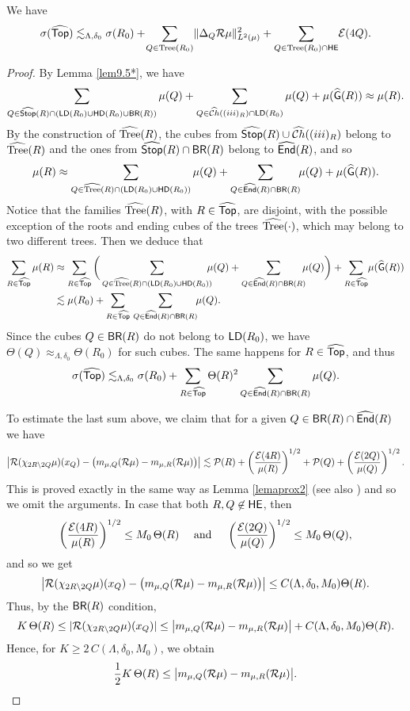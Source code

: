 \vv


\begin{lemma}\label{lemtop8}
We have
$$\sigma({\widehat{{\mathsf {Top}}}})  \lesssim_{\Lambda,\delta_0}\sigma(R_0) +\!\sum_{Q\in{\rm Tree}(R_0)}\!\|\Delta_Q{\mathcal R}\mu\|_{L^2(\mu)}^2+ \sum_{Q\in{\rm Tree}(R_0)\cap{\mathsf {HE}}}\! {\mathcal E}(4Q).$$
\end{lemma}

\begin{proof} 
By Lemma \ref{lem9.5*}, we have
$$\sum_{Q\in{\widehat{{\mathsf {Stop}}}}(R)\cap({\mathsf{LD}}(R_0)\cup{\mathsf{HD}}(R_0)\cup{\mathsf {BR}}(R))}\mu(Q) 
+\sum_{Q\in{\widehat{{\mathcal Ch}}}((iii)_R)\cap {\mathsf{LD}}(R_0)}\mu(Q) + \mu({\widehat{{\mathsf{G}}}}(R))
\approx \mu(R).$$
By the construction of ${\widehat{{\rm Tree}}}(R)$, the cubes from 
${\widehat{{\mathsf {Stop}}}}(R)\cup {\widehat{{\mathcal Ch}}}((iii)_R)$ belong to ${\widehat{{\rm Tree}}}(R)$ and the ones from ${\widehat{{\mathsf {Stop}}}}(R)\cap{\mathsf {BR}}(R)$ belong to ${\widehat{{\mathsf{End}}}}(R)$, and so
$$\mu(R)\approx \sum_{Q\in{\widehat{{\rm Tree}}}(R)\cap({\mathsf{LD}}(R_0)\cup{\mathsf{HD}}(R_0))}\mu(Q) 
+ \sum_{Q\in{\widehat{{\mathsf{End}}}}(R)\cap{\mathsf {BR}}(R)}\!\!\mu(Q)
+ \mu({\widehat{{\mathsf{G}}}}(R)).$$
Notice that the families ${\widehat{{\rm Tree}}}(R)$, with $R\in{\widehat{{\mathsf {Top}}}}$, are disjoint, with the possible exception of
the roots and ending cubes of the trees ${\widehat{{\rm Tree}}}(\cdot)$, which may belong to two different trees. 
Then we deduce that
\begin{align*}
\sum_{R\in\wh\ttt} \mu(R) & \approx \sum_{R\in\wh\ttt} \bigg(
\sum_{Q\in\wh\tree(R)\cap(\LD(R_0)\cup\HD(R_0))}\!\!\!\!\mu(Q) + \sum_{Q\in\wh\End(R)\cap\BR(R)}\!\!\!\mu(Q)\bigg)
+\sum_{R\in\wh\ttt}\! \mu(\wh\sG(R))\\
& \lesssim \mu(R_0) + \sum_{R\in\wh\ttt}\,\sum_{Q\in\wh\End(R)\cap\BR(R)}\!\!\mu(Q).
\end{align*}
Since the cubes $Q\in{\mathsf {BR}}(R)$ do not belong to ${\mathsf{LD}}(R_0)$, we have $\Theta(Q)\approx_{\Lambda,\delta_0} \Theta(R_0)$ for such cubes. The same happens for $R\in{\widehat{{\mathsf {Top}}}}$, and thus
\begin{equation}\label{eqthus883}
\sigma({\widehat{{\mathsf {Top}}}})  \lesssim_{\Lambda,\delta_0} \sigma(R_0) + \sum_{R\in{\widehat{{\mathsf {Top}}}}} \Theta(R)^2\sum_{Q\in{\widehat{{\mathsf{End}}}}(R)\cap{\mathsf {BR}}(R)}\mu(Q).
\end{equation}

To estimate the last sum above, we claim that for a given $Q\in{\mathsf {BR}}(R)\cap{\widehat{{\mathsf{End}}}}(R)$ we have
$$\big|{\mathcal R}(\chi_{2R\setminus 2Q}\mu)(x_Q) - 
\big(m_{\mu,Q}({\mathcal R}\mu) - m_{\mu,R}({\mathcal R}\mu)\big)\big|
\lesssim {\mathcal P}(R) + \left(\frac{{\mathcal E}(4R)}{\mu(R)}\right)^{1/2} + {\mathcal P}(Q) +  \left(\frac{{\mathcal E}(2Q)}{\mu(Q)}\right)^{1/2}.$$
This is proved exactly in the same way as Lemma \ref{lemaprox2} (see also ) and so we omit the arguments. 
In case that both $R,Q\not\in {\mathsf {HE}}$, then 
$$\left(\frac{{\mathcal E}(4R)}{\mu(R)}\right)^{1/2}\leq M_0\,\Theta(R)\quad \text{ and }\quad   \left(\frac{{\mathcal E}(2Q)}{\mu(Q)}\right)^{1/2}\leq M_0\,\Theta(Q),$$
and so
we get
$$\big|{\mathcal R}(\chi_{2R\setminus 2Q}\mu)(x_Q) - 
\big(m_{\mu,Q}({\mathcal R}\mu) - m_{\mu,R}({\mathcal R}\mu)\big)\big|
\leq C(\Lambda,\delta_0,M_0) \Theta(R).$$
Thus, by the ${\mathsf {BR}}(R)$ condition,
$$K\,\Theta(R) \leq |{\mathcal R}(\chi_{2R\setminus 2Q}\mu)(x_Q)| \leq 
\big|m_{\mu,Q}({\mathcal R}\mu) - m_{\mu,R}({\mathcal R}\mu)\big| + C(\Lambda,\delta_0,M_0) \Theta(R).$$
Hence, for $K\geq 2\,C(\Lambda,\delta_0,M_0)$, we obtain
$$\frac12K\,\Theta(R) \leq 
\big|m_{\mu,Q}({\mathcal R}\mu) - m_{\mu,R}({\mathcal R}\mu)\big|.$$


\end{proof}
